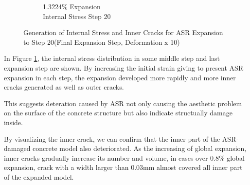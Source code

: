 \begin{figure}[h!]
\begin{subfigure}{.25\textwidth}
      \caption{1.3224\% Expansion\\Internal Stress Step 20}
    \end{subfigure}

    

\caption{Generation of Internal Stress and Inner Cracks for ASR Expansion to Step 20(Final Expansion Step, Deformation x 10)}
\label{fig:A30_P75_stress}
\end{figure}

In Figure \ref{fig:A30_P75_stress}, the internal stress distribution in some middle step and last expansion step are shown. By increasing the initial strain giving to present ASR expansion in each step, the expansion developed more rapidly and more inner cracks generated as well as outer cracks.

This suggests deteration caused by ASR not only causing the aesthetic problem on the surface of the concrete structure but also indicate structually damage inside.

By visualizing the inner crack, we can confirm that the inner part of the ASR-damaged concrete model also deteriorated. As the increasing of global expansion, inner cracks gradually increase its number and volume, in cases over 0.8\% global expansion, crack with a width larger than 0.03mm almost covered all inner part of the expanded model.
